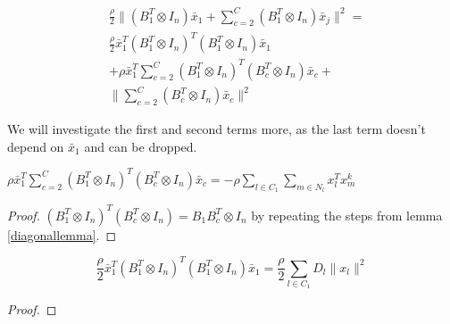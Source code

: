 \begin{align*}
&\frac{\rho}{2}\|\left(B_1^T \otimes I_n\right)\bar{x}_1 + \sum_{c=2}^C \left(B_1^T \otimes I_n\right)\bar{x}_j\|^2 = 
\\
& \frac{\rho}{2}\bar{x}_1^T  \left(B_1^T \otimes I_n\right)^T \left(B_1^T \otimes I_n\right) \bar{x}_1 \\
&+ \rho \bar{x}_1^T \sum	_{c=2}^C \left(B_1^T \otimes I_n\right)^T \left(B_c^T \otimes I_n\right) \bar{x}_c + 
\\
& \|\sum_{c=2}^C  \left(B_c^T \otimes I_n\right) \bar{x}_c\|^2
\end{align*}

We will investigate the first and second terms more, as the last term doesn't depend on \(\bar{x}_1\) and can be dropped.

\begin{lemma}
\(\rho \bar{x}_1^T \sum	_{c=2}^C \left(B_1^T \otimes I_n\right)^T \left(B_c^T \otimes I_n\right) \bar{x}_c = -\rho\sum_{l\in C_1} \sum_{m\in N_l} x_l^Tx_m^k\)
\begin{proof}
\(\left(B_1^T \otimes I_n\right)^T \left(B_c^T \otimes  I_n\right) = B_1B_c^T \otimes I_n\) by repeating the steps from lemma \ref{diagonallemma}. 
\end{proof}
\end{lemma}


\begin{lemma}
\begin{equation}
\frac{\rho}{2}\bar{x}_1^T  \left(B_1^T \otimes I_n\right)^T \left(B_1^T \otimes I_n\right) \bar{x}_1 = \frac{\rho}{2}\sum_{l \in C_1} D_l \|x_l\|^2
\end{equation}

\begin{proof}

\end{proof}
\label{diagonallemma}
\end{lemma}